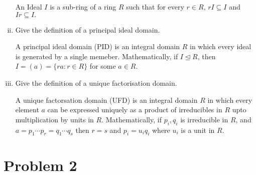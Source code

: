 \documentclass[12pt]{article}
\begin{document}
\begin{enumerate}[(i)]
    \noindent An Ideal $I$ is a sub-ring of a ring $R$ such that for every $r \in  R$, $rI \subseteq I$ and $Ir \subseteq I.$

    \item  Give the definition of a principal ideal domain.

    \noindent A principal ideal domain (PID) is an integral domain $R$ in which every ideal is generated by a single memeber. Mathematically, if $I \unlhd R$, then $I = (a) =  \{ra : r     \in R\}$ for some $a \in R$.


    \item Give the definition of a unique factorisation domain.

    \noindent A unique factorsation domain (UFD) is an integral domain $R$ in which every element $a$ can be expressed uniquely as a product of irreducibles in $R$ upto multiplication by units in $R$. Mathematically, if $p_i, q_i$ is irreducible in $R$, and $a = p_1 \cdots p_r = q_1 \cdots q_s$ then $r = s$ and $p_i = u_iq_i$ where $u_i$ is a unit in $R.$ 
    
  \end{enumerate}
\newcommand{\brk}[1]{\langle #1 \rangle}
  \section*{Problem 2}
\end{document}
